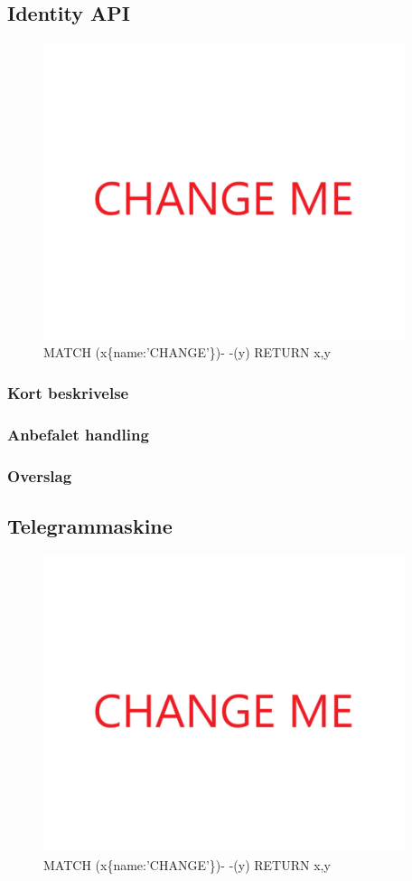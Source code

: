 \documentclass{article}
\begin{document}
\subsection{Identity API}
\begin{figure}[h]
\includegraphics[width=300pt]{CHANGE.PNG}
\caption{MATCH (x\{name:'CHANGE'\})- -(y) RETURN x,y}
\end{figure}
\subsubsection{Kort beskrivelse}
\subsubsection{Anbefalet handling}
\subsubsection{Overslag}
\subsection{Telegrammaskine}
\begin{figure}[h]
\includegraphics[width=300pt]{CHANGE.PNG}
\caption{MATCH (x\{name:'CHANGE'\})- -(y) RETURN x,y}
\end{figure}
\end{document}
